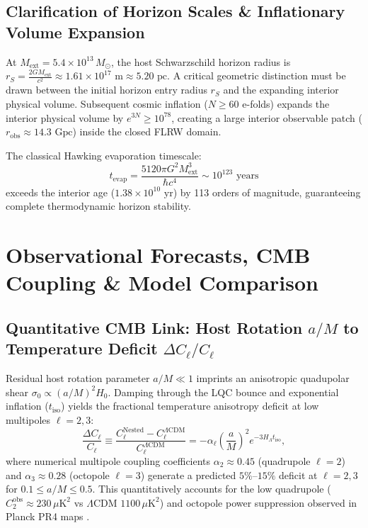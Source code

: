 \documentclass[11pt,a4paper]{article}
\theoremstyle{definition}
\begin{document}
\subsection{Clarification of Horizon Scales \& Inflationary Volume Expansion}\label{sec:causal_decoupling}
At $M_{\text{ext}} = 5.4 \times 10^{13} \, M_\odot$, the host Schwarzschild horizon radius is $r_S = \frac{2GM_{\text{ext}}}{c^2} \approx 1.61 \times 10^{17} \text{ m} \approx 5.20 \text{ pc}$. A critical geometric distinction must be drawn between the initial horizon entry radius $r_S$ and the expanding interior physical volume. Subsequent cosmic inflation ($N \ge 60$ e-folds) expands the interior physical volume by $e^{3N} \ge 10^{78}$, creating a large interior observable patch ($r_{\text{obs}} \approx 14.3 \text{ Gpc}$) inside the closed FLRW domain.

The classical Hawking evaporation timescale:
\begin{equation}\label{eq:hawking_time}
    t_{\text{evap}} = \frac{5120 \pi G^2 M_{\text{ext}}^3}{\hbar c^4} \sim 10^{123} \text{ years}
\end{equation}
exceeds the interior age ($1.38 \times 10^{10} \text{ yr}$) by 113 orders of magnitude, guaranteeing complete thermodynamic horizon stability.

\section{Observational Forecasts, CMB Coupling \& Model Comparison}\label{sec:observational}

\subsection{Quantitative CMB Link: Host Rotation $a/M$ to Temperature Deficit $\Delta C_\ell / C_\ell$}\label{sec:cmb_suppression}
Residual host rotation parameter $a/M \ll 1$ imprints an anisotropic quadupolar shear $\sigma_0 \propto (a/M)^2 H_0$. Damping through the LQC bounce and exponential inflation ($t_{\text{iso}}$) yields the fractional temperature anisotropy deficit at low multipoles $\ell = 2, 3$:
\begin{equation}\label{eq:cmb_deficit}
    \frac{\Delta C_\ell}{C_\ell} \equiv \frac{C_\ell^{\text{Nested}} - C_\ell^{\Lambda\text{CDM}}}{C_\ell^{\Lambda\text{CDM}}} = -\alpha_\ell \left(\frac{a}{M}\right)^2 e^{-3 H_\Lambda t_{\text{iso}}},
\end{equation}
where numerical multipole coupling coefficients $\alpha_2 \approx 0.45$ (quadrupole $\ell=2$) and $\alpha_3 \approx 0.28$ (octopole $\ell=3$) generate a predicted $5\%\text{--}15\%$ deficit at $\ell = 2, 3$ for $0.1 \le a/M \le 0.5$. This quantitatively accounts for the low quadrupole ($C_2^{\text{obs}} \approx 230 \, \mu\text{K}^2$ vs $\Lambda\text{CDM}$ $1100 \, \mu\text{K}^2$) and octopole power suppression observed in Planck PR4 maps \cite{gaztanaga2021}.
\end{document}
